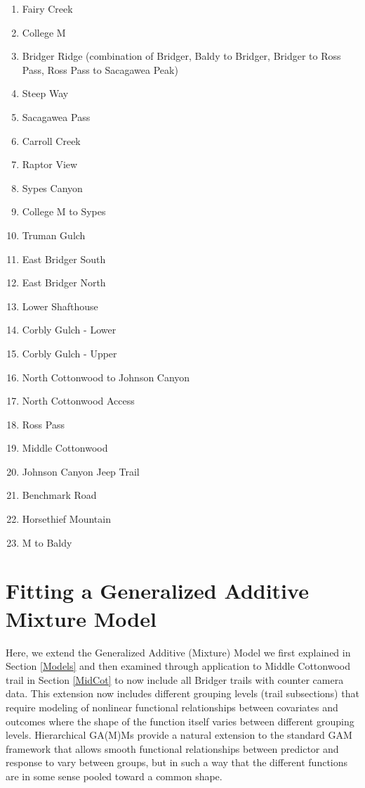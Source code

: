 \documentclass[
]{book}
\providecommand{\tightlist}{%
  \setlength{\itemsep}{0pt}\setlength{\parskip}{0pt}}
\begin{document}
\begin{enumerate}
\def\labelenumi{\arabic{enumi}.}
\tightlist
\item
  Fairy Creek
\item
  College M
\item
  Bridger Ridge (combination of Bridger, Baldy to Bridger, Bridger to Ross Pass, Ross Pass to Sacagawea Peak)
\item
  Steep Way
\item
  Sacagawea Pass
\item
  Carroll Creek
\item
  Raptor View
\item
  Sypes Canyon
\item
  College M to Sypes
\item
  Truman Gulch
\item
  East Bridger South
\item
  East Bridger North
\item
  Lower Shafthouse
\item
  Corbly Gulch - Lower
\item
  Corbly Gulch - Upper
\item
  North Cottonwood to Johnson Canyon
\item
  North Cottonwood Access
\item
  Ross Pass
\item
  Middle Cottonwood
\item
  Johnson Canyon Jeep Trail
\item
  Benchmark Road
\item
  Horsethief Mountain
\item
  M to Baldy
\end{enumerate}

\hypertarget{fitting-a-generalized-additive-mixture-model}{%
\section{Fitting a Generalized Additive Mixture Model}\label{fitting-a-generalized-additive-mixture-model}}

Here, we extend the Generalized Additive (Mixture) Model we first explained in Section \ref{Models} and then examined through application to Middle Cottonwood trail in Section \ref{MidCot} to now include all Bridger trails with counter camera data. This extension now includes different grouping levels (trail subsections) that require modeling of nonlinear functional relationships between covariates and outcomes where the shape of the function itself varies between different grouping levels. Hierarchical GA(M)Ms provide a natural extension to the standard GAM framework that allows smooth functional relationships between predictor and response to vary between groups, but in such a way that the different functions are in some sense pooled toward a common shape.
\end{document}
